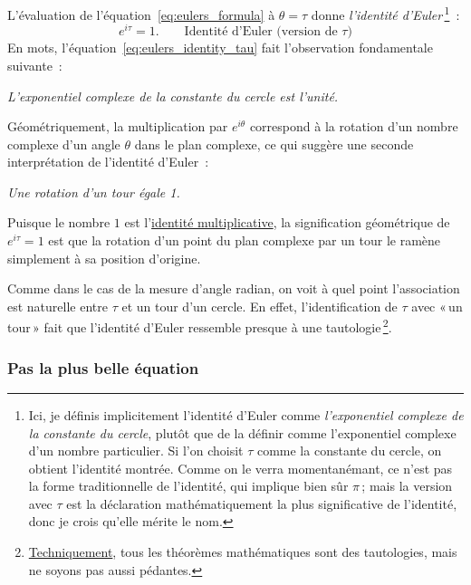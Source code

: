L'évaluation de l'équation~\eqref{eq:eulers_formula} à $\theta = \tau$ donne \emph{l'identité d'Euler}\,\footnote{Ici, je définis implicitement l'identité d'Euler comme \emph{l'exponentiel complexe de la constante du cercle}, plutôt que de la définir comme l'exponentiel complexe d'un nombre particulier. Si l'on choisit $\tau$ comme la constante du cercle, on obtient l'identité montrée. Comme on le verra momentanémant, ce n'est pas la forme traditionnelle de l'identité, qui implique bien sûr $\pi$\,; mais la version avec $\tau$ est la déclaration mathématiquement la plus significative de l'identité, donc je crois qu'elle mérite le nom.}~:
\begin{equation}
\label{eq:eulers_identity_tau}
e^{i\tau} = 1. \qquad\mbox{Identité d'Euler (version de $\tau$)}
\end{equation}
En mots, l'équation~\eqref{eq:eulers_identity_tau} fait l'observation fondamentale suivante~:

\begin{center}
\emph{L'exponentiel complexe de la constante du cercle est l'unité.}
\end{center}

Géométriquement, la multiplication par $e^{i\theta}$ correspond à la rotation d'un nombre complexe d'un angle $\theta$ dans le plan complexe, ce qui suggère une seconde interprétation de l'identité d'Euler~:

\begin{center}
\emph{Une rotation d'un tour égale 1.}
\end{center}

\noindent Puisque le nombre $1$ est l'\href{https://fr.wikipedia.org/wiki/%C3%89l%C3%A9ment_neutre}{identité multiplicative}, la signification géométrique de $e^{i\tau} = 1$ est que la rotation d'un point du plan complexe par un tour le ramène simplement à sa position d'origine.

Comme dans le cas de la mesure d'angle radian, on voit à quel point l'association est naturelle entre $\tau$ et un tour d'un cercle. En effet, l'identification de $\tau$ avec «\,un tour\,» fait que l'identité d'Euler ressemble presque à une tautologie\,\footnote{\href{https://bit.ly/32mB2CF}{Techniquement}, tous les théorèmes mathématiques sont des tautologies, mais ne soyons pas aussi pédantes.}.

    \subsubsection{Pas la plus belle équation} %
    \label{sec:not_the_most_beautiful_equation}

